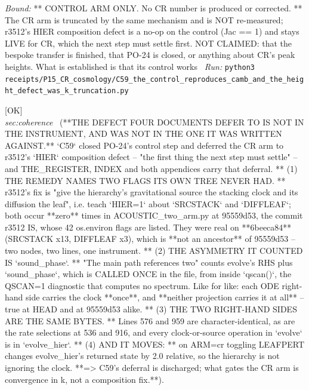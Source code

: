\begin{description}
 \emph{Bound:} ** CONTROL ARM ONLY. No CR number is produced or corrected. ** The CR arm is truncated by the same mechanism and is NOT re-measured; r3512's HIER composition defect is a no-op on the control (Jac == 1) and stays LIVE for CR, which the next step must settle first. NOT CLAIMED: that the bespoke transfer is finished, that PO-24 is closed, or anything about CR's peak heights. What is established is that its control works
\ \emph{Run:} \texttt{python3 receipts/P15\_CR\_cosmology/C59\_the\_control\_reproduces\_camb\_and\_the\_height\_defect\_was\_k\_truncation.py}
\item[\label{rcpt:C60_the_hier_composition_defect_names_two_flags_its_own_tree_never_had}\texttt{C60\_the\_hier\_composition\_defect\_names\_two\_flags\_its\_own\_tree\_never\_had}]\hfill\textsf{[OK]}\\
\textit{sec:coherence} \ (**THE DEFECT FOUR DOCUMENTS DEFER TO IS NOT IN THE INSTRUMENT, AND WAS NOT IN THE ONE IT WAS WRITTEN AGAINST.** `C59` closed PO-24's control step and deferred the CR arm to r3512's `HIER` composition defect -- "the first thing the next step must settle" -- and THE\_REGISTER, INDEX and both appendices carry that deferral. ** (1) THE REMEDY NAMES TWO FLAGS ITS OWN TREE NEVER HAD. ** r3512's fix is "give the hierarchy's gravitational source the stacking clock and its diffusion the leaf", i.e. teach `HIER=1` about `SRCSTACK` and `DIFFLEAF`; both occur **zero** times in ACOUSTIC\_two\_arm.py at 95559d53, the commit r3512 IS, whose 42 os.environ flags are listed. They were real on **6beeca84** (SRCSTACK x13, DIFFLEAF x3), which is **not an ancestor** of 95559d53 -- two nodes, two lines, one instrument. ** (2) THE ASYMMETRY IT COUNTED IS `sound\_phase`. ** "The main path references two" counts evolve's RHS plus `sound\_phase`, which is CALLED ONCE in the file, from inside `qscan()`, the QSCAN=1 diagnostic that computes no spectrum. Like for like: each ODE right-hand side carries the clock **once**, and **neither projection carries it at all** -- true at HEAD and at 95559d53 alike. ** (3) THE TWO RIGHT-HAND SIDES ARE THE SAME BYTES. ** Lines 576 and 959 are character-identical, as are the rate selections at 536 and 916, and every clock-or-source operation in `evolve` is in `evolve\_hier`. ** (4) AND IT MOVES: ** on ARM=cr toggling LEAFPERT changes evolve\_hier's returned state by 2.0 relative, so the hierarchy is not ignoring the clock. **=> C59's deferral is discharged; what gates the CR arm is convergence in k, not a composition fix.**). 

\end{description}
